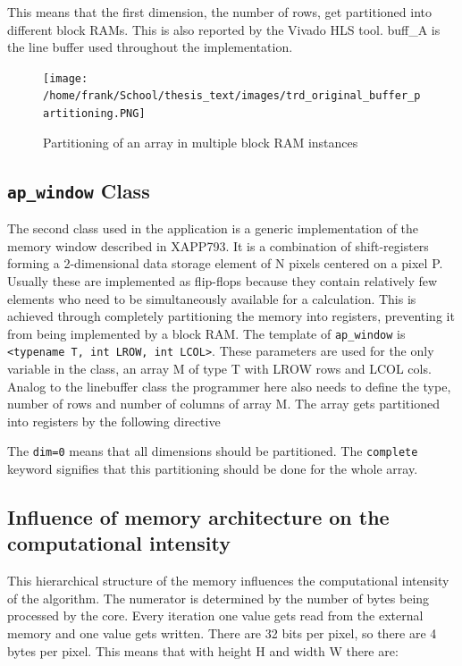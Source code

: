 This means that the first dimension, the number of rows, get partitioned into different block RAMs. This is also reported by the Vivado HLS tool. buff\_A is the line buffer used throughout the implementation.\\

\medskip

\begin{figure}[h]
\centering
\texttt{[image: /home/frank/School/thesis\_text/images/trd\_original\_buffer\_partitioning.PNG]} 
\caption{Partitioning of an array in multiple block RAM instances}
\end{figure}


\subsection{\texttt{ap\_window} Class}

The second class used in the application is a generic implementation of the memory window described in XAPP793. It is a combination of shift-registers forming a 2-dimensional data storage element of N pixels centered on a pixel P. Usually these are implemented as flip-flops because they contain relatively few elements who need to be simultaneously available for a calculation. This is achieved through completely partitioning the memory into registers, preventing it from being implemented by a block RAM.
The template of \texttt{ap\_window} is \texttt{<typename T, int LROW, int LCOL>}. These parameters are used for the only variable in the class, an array M of type T with LROW rows and LCOL cols. Analog to the linebuffer class the programmer here also needs to define the type, number of rows and number of columns of array M. The array gets partitioned into registers by the following directive




The \texttt{dim=0} means that all dimensions should be partitioned. The \texttt{complete} keyword signifies that this partitioning should be done for the whole array.


\subsection{Influence of memory architecture on the computational intensity}

This hierarchical structure of the memory influences the computational intensity of the algorithm. The numerator is determined by the number of bytes being processed by the core. Every iteration one value gets read from the external memory and one value gets written.  There are 32 bits per pixel, so there are 4 bytes per pixel. This means that with height H and width W there are:

